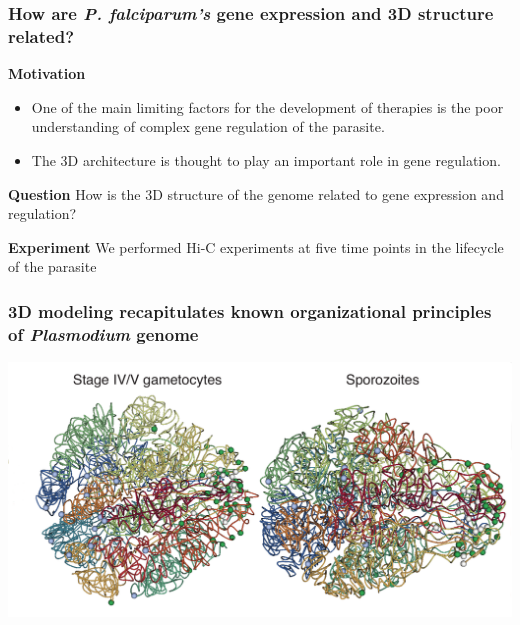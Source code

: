 \documentclass[11pt,xcolor=dvipsnames]{beamer}
\begin{document}
\begin{frame}
\frametitle{How are {\em P. falciparum's} gene expression and 3D structure related?}
{\color{Blue} \textbf{Motivation}}
\begin{itemize}[label={$\bullet$}]

\item One of the main limiting factors for the
development of therapies is the poor understanding of complex gene regulation
of the parasite.
\item The 3D architecture is thought to play an important role in gene
regulation.
\end{itemize}

\vspace{1em}
{\color{Blue} \textbf{Question}} How is the 3D structure of the genome related
to gene expression and regulation?

\vspace{1em}
{\color{Blue} \textbf{Experiment}} We performed Hi-C experiments at five time
points in the lifecycle of the parasite 

\end{frame}

\begin{frame}
\frametitle{3D modeling recapitulates known organizational principles of {\em Plasmodium} genome}
  
\begin{center}
  \includegraphics[width=0.95\linewidth]{images/3D_structures_gam_spo.png}
\end{center}
  
\end{frame}
  
\end{document}
